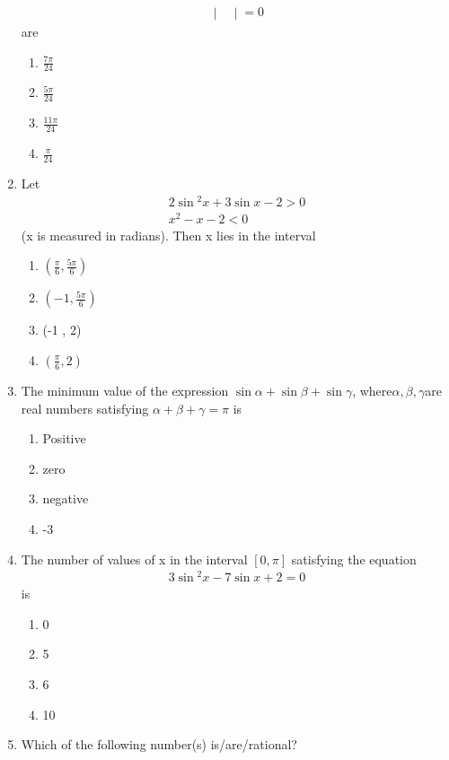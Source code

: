 \begin{enumerate}[label=\arabic*.,ref=\thesubsection.\theenumi]
\begin{align}
\begin{vmatrix}
        \end{vmatrix}=0 
    \end{align}are
    \begin{enumerate}
        \item $\frac{7\pi}{24}$
        \item $\frac{5\pi}{24}$
        \item $\frac{11\pi}{24}$
        \item $\frac{\pi}{24}$
    \end{enumerate}
    \item Let 
    \begin{align}
    2\sin{^2x}+3\sin{x}-2>0\\x^2-x-2 < 0
    \end{align}(x is measured in radians). Then x lies in the interval
    \begin{enumerate}
        \item$(\frac{\pi}{6},\frac{5\pi}{6})$
        \item$(-1,\frac{5\pi}{6})$
        \item (-1 , 2)
        \item$(\frac{\pi}{6},2)$
    \end{enumerate}
    \item The minimum value of the expression $\sin{\alpha} + \sin{\beta} + \sin{\gamma}$, where$\alpha,\beta,\gamma$are real numbers satisfying $\alpha+\beta+\gamma=\pi$ is
    \begin{enumerate}
        \item Positive
        \item zero
        \item negative
        \item -3
    \end{enumerate}
    \item The number of values of x in the interval $[0,\pi]$ satisfying the equation 
    \begin{align}
        3\sin{^2x} -7\sin{x}+2 =0
    \end{align}
    is 
    \begin{enumerate}
        \item 0
        \item 5
        \item 6
        \item 10
    \end{enumerate}
    \item Which of the following number(s) is/are/rational?
    \begin{enumerate}

\end{enumerate}
\end{enumerate}
